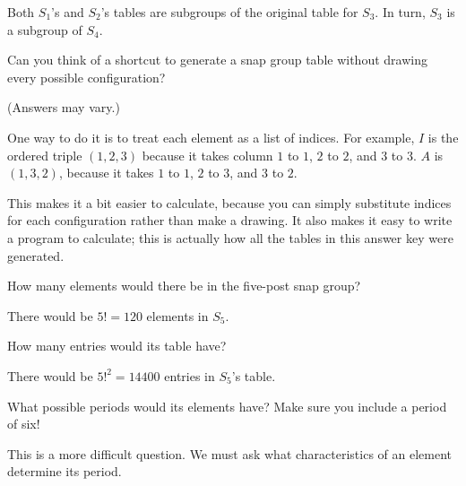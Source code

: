 \documentclass[../key.tex]{subfiles}
\begin{document}
\noindent Both $S_1$'s and $S_2$'s tables are subgroups of the original table for $S_3$. In turn, $S_3$ is a subgroup of $S_4$.

\begin{outer_problem}
\item Can you think of a shortcut to generate a snap group table without drawing every possible configuration?
\end{outer_problem}

\noindent (Answers may vary.)

One way to do it is to treat each element as a list of indices. For example, $I$ is the ordered triple $(1,2,3)$ because it takes column $1$ to $1$, $2$ to $2$, and $3$ to $3$. $A$ is $(1,3,2)$, because it takes $1$ to $1$, $2$ to $3$, and $3$ to $2$.

This makes it a bit easier to calculate, because you can simply substitute indices for each configuration rather than make a drawing. It also makes it easy to write a program to calculate; this is actually how all the tables in this answer key were generated.

\begin{outer_problem}
\item

\begin{inner_problem}[start=1,leftmargin=25pt]
\item How many elements would there be in the five-post snap group? \label{prob:five_post_snap_list_start}
\end{inner_problem}
\end{outer_problem}

\noindent There would be $5!=120$ elements in $S_5$.

\begin{inner_problem}
	\item How many entries would its table have?
\end{inner_problem}

\noindent There would be $5!^2=14400$ entries in $S_5$'s table.

\begin{inner_problem}
\item What possible periods would its elements have? Make sure you include a period of six! \label{prob:five_post_snap_list_end}
\end{inner_problem}

\noindent This is a more difficult question. We must ask what characteristics of an element determine its period.
\end{document}
